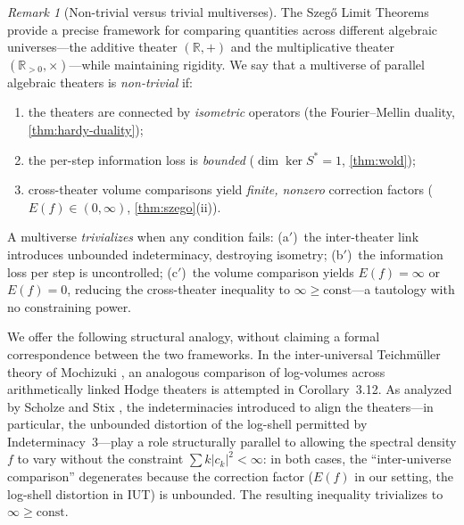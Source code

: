 \documentclass[12pt]{amsart}
\theoremstyle{definition}
\theoremstyle{remark}
\newtheorem*{remark}{Remark}
\newcommand{\R}{\mathbb{R}}
\newcommand{\Rpos}{\mathbb{R}_{>0}}
\begin{document}
\begin{remark}[Non-trivial versus trivial multiverses]
The Szeg\H{o} Limit Theorems provide a precise framework for comparing quantities across different algebraic universes---the additive theater $(\R, +)$ and the multiplicative theater $(\Rpos, \times)$---while maintaining rigidity. We say that a multiverse of parallel algebraic theaters is \emph{non-trivial} if:
\begin{enumerate}[label=(\alph*)]
\item the theaters are connected by \emph{isometric} operators (the Fourier--Mellin duality, \cref{thm:hardy-duality});
\item the per-step information loss is \emph{bounded} ($\dim \ker S^* = 1$, \cref{thm:wold});
\item cross-theater volume comparisons yield \emph{finite, nonzero} correction factors ($E(f) \in (0, \infty)$, \cref{thm:szego}(ii)).
\end{enumerate}
A multiverse \emph{trivializes} when any condition fails: (a${}'$)~the inter-theater link introduces unbounded indeterminacy, destroying isometry; (b${}'$)~the information loss per step is uncontrolled; (c${}'$)~the volume comparison yields $E(f) = \infty$ or $E(f) = 0$, reducing the cross-theater inequality to $\infty \geq \text{const}$---a tautology with no constraining power.

We offer the following structural analogy, without claiming a formal correspondence between the two frameworks. In the inter-universal Teichm\"uller theory of Mochizuki \cite{MochizukiIII}, an analogous comparison of log-volumes across arithmetically linked Hodge theaters is attempted in Corollary~3.12. As analyzed by Scholze and Stix \cite{ScholzeStix}, the indeterminacies introduced to align the theaters---in particular, the unbounded distortion of the log-shell permitted by Indeterminacy~3---play a role structurally parallel to allowing the spectral density $f$ to vary without the constraint $\sum k |c_k|^2 < \infty$: in both cases, the ``inter-universe comparison'' degenerates because the correction factor ($E(f)$ in our setting, the log-shell distortion in IUT) is unbounded. The resulting inequality trivializes to $\infty \geq \mathrm{const}$.


\end{remark}
\end{document}
